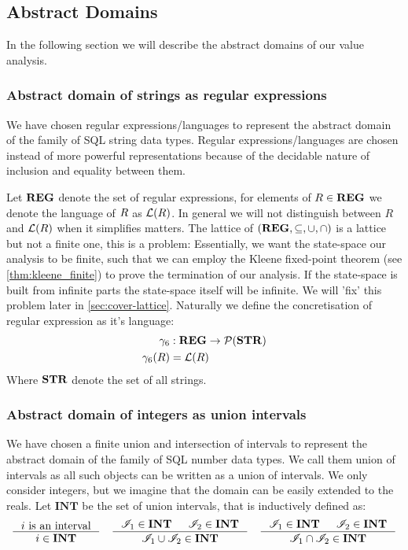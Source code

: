 \subsection{Abstract Domains}\label{subsec:abstract-domains}

In the following section we will describe the abstract domains of our value analysis.

\subsubsection{Abstract domain of strings as regular expressions}\label{subsubsec:abstract_domains_strings}
We have chosen regular expressions/languages to represent the abstract domain of the family of SQL string data types.
Regular expressions/languages are chosen instead of more powerful representations because of the decidable nature of inclusion and equality between them.

Let $\mathbf{REG}$ denote the set of regular expressions, for elements of $R \in \mathbf{REG}$ we denote the language of $R$ as $\mathcal{L}(R)$.
In general we will not distinguish between $R$ and $\mathcal{L}(R)$ when it simplifies matters.
The lattice of $(\mathbf{REG}, \subseteq, \cup, \cap)$ is a lattice but not a finite one, this is a problem: Essentially, we want the state-space our analysis to be finite, such that we can employ the Kleene fixed-point theorem (see \autoref{thm:kleene_finite}) to prove the termination of our analysis.
If the state-space is built from infinite parts the state-space itself will be infinite.
We will 'fix' this problem later in \autoref{sec:cover-lattice}.
Naturally we define the concretisation of regular expression as it's language:
\begin{align}
    \gamma_6 &: \mathbf{REG} \rightarrow \mathcal{P}(\mathbf{STR}) \\
    \gamma_6(R) &= \mathcal{L}(R)
\end{align}
Where $\mathbf{STR}$ denote the set of all strings.

\subsubsection{Abstract domain of integers as union intervals}\label{subsubsec:abstract_domains_numbers} We have chosen a finite union and intersection of intervals to represent the abstract domain of the family of SQL number data types.
We call them union of intervals as all such objects can be written as a union of intervals.
We only consider integers, but we imagine that the domain can be easily extended to the reals.
Let $\mathbf{INT}$ be the set of union intervals, that is inductively defined as:
\[
    \inference{i \text{ is an interval}}{i \in \mathbf{INT}} \quad
    \inference{\mathscr{I}_1 \in \textbf{INT} & \mathscr{I}_2 \in \textbf{INT}}{\mathscr{I}_1 \cup  \mathscr{I}_2 \in \mathbf{INT}} \quad
    \inference{\mathscr{I}_1 \in \textbf{INT} & \mathscr{I}_2 \in \textbf{INT}}{\mathscr{I}_1 \cap  \mathscr{I}_2 \in \mathbf{INT}}
\]

